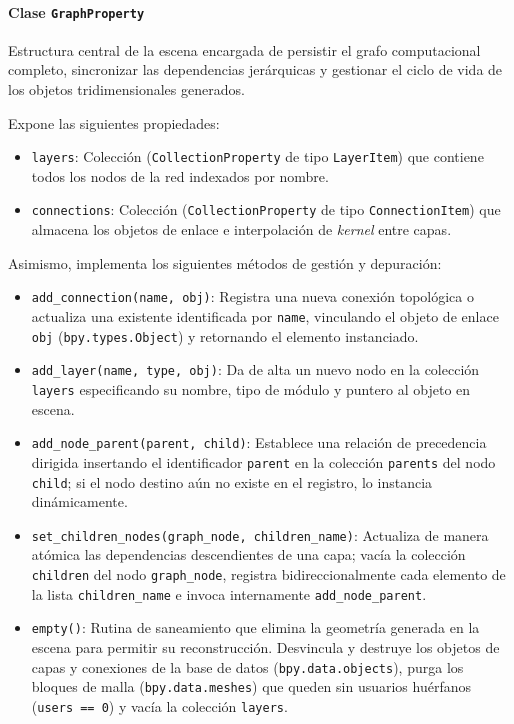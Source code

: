 \paragraph{Clase \texttt{GraphProperty}}
Estructura central de la escena encargada de persistir el grafo computacional completo, sincronizar las dependencias 
jerárquicas y gestionar el ciclo de vida de los objetos tridimensionales generados.
\medskip

Expone las siguientes propiedades:
\begin{itemize}
    \item \texttt{layers}: Colección (\texttt{CollectionProperty} de tipo \texttt{LayerItem}) que contiene todos los nodos de la red indexados por nombre.
    \item \texttt{connections}: Colección (\texttt{CollectionProperty} de tipo \texttt{ConnectionItem}) que almacena los objetos de enlace e interpolación de 
    \textit{kernel} entre capas.
\end{itemize}

Asimismo, implementa los siguientes métodos de gestión y depuración:
\begin{itemize}
    \item \texttt{add\_connection(name, obj)}: Registra una nueva conexión topológica o actualiza una existente identificada por \texttt{name}, vinculando 
    el objeto de enlace \texttt{obj} (\texttt{bpy.types.Object}) y retornando el elemento instanciado.
    \item \texttt{add\_layer(name, type, obj)}: Da de alta un nuevo nodo en la colección \texttt{layers} especificando su nombre, tipo de módulo y puntero 
    al objeto en escena.
    \item \texttt{add\_node\_parent(parent, child)}: Establece una relación de precedencia dirigida insertando el identificador \texttt{parent} en la 
    colección \texttt{parents} del nodo \texttt{child}; si el nodo destino aún no existe en el registro, lo instancia dinámicamente.
    \item \texttt{set\_children\_nodes(graph\_node, children\_name)}: Actualiza de manera atómica las dependencias descendientes de una capa; vacía la 
    colección \texttt{children} del nodo \texttt{graph\_node}, registra bidireccionalmente cada elemento de la lista \texttt{children\_name} e invoca 
    internamente \texttt{add\_node\_parent}.
    \item \texttt{empty()}: Rutina de saneamiento que elimina la geometría generada en la escena para permitir su reconstrucción. Desvincula y destruye 
    los objetos de capas y conexiones de la base de datos (\texttt{bpy.data.objects}), purga los bloques de malla (\texttt{bpy.data.meshes}) que queden 
    sin usuarios huérfanos (\texttt{users == 0}) y vacía la colección \texttt{layers}.
\end{itemize}

